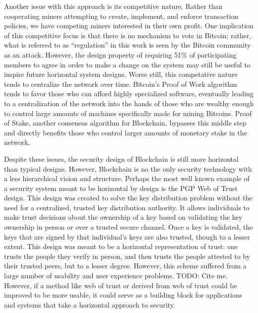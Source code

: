 Another issue with this approach is its competitive nature. Rather than
cooperating miners attempting to create, implement, and enforce transaction
policies, we have competing miners interested in their own profit. One
implication of this competitive focus is that there is no mechanism to vote in
Bitcoin; rather, what is referred to as ``regulation'' in this work is seen by
the Bitcoin community as an attack. However, the design property of requiring
51\% of participating members to agree in order to make a change on the system
may still be useful to inspire future horizontal system designs. Worse still,
this competative nature tends to centralize the network over time. Bitcoin's
Proof of Work algorithm tends to favor those who can afford highly specialized
software, eventually leading to a centralization of the network into the hands
of those who are wealthy enough to control large amounts of machines
specifically made for mining Bitcoins. Proof of Stake, another consensus
algorithm for Blockchain, bypasses this middle step and directly benefits those
who control larger amounts of monetary stake in the network.

Despite these issues, the security design of Blockchain is still more horizontal
than typical designs. However, Blockchain is no the only security technology
with a less hierarchical vision and structure. Perhaps the most well known
example of a security system meant to be horizontal by design is the PGP Web of
Trust design. This design was created to solve the key distribution problem
without the need for a centralized, trusted key distribution authority. It
allows individuals to make trust decisions about the ownership of a key based on
validating the key ownership in person or over a trusted secure channel. Once a
key is validated, the keys that are signed by that individual's keys are also
trusted, though to a lesser extent. This design was meant to be a horizontal
representation of trust: one trusts the people they verify in person, and then
trusts the people attested to by their trusted peers, but to a lesser degree.
However, this scheme suffered from a large number of usability and user
experience problems. {\color{red} TODO: Cite me.} However, if a method like web
of trust or derived from web of trust could be improved to be more usable, it
could serve as a building block for applications and systems that take a
horizontal approach to security.

